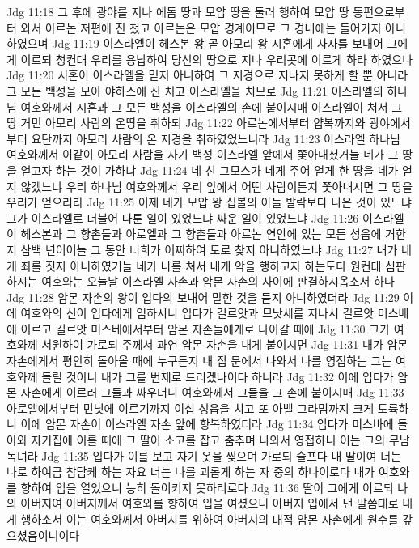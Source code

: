Jdg 11:18  그 후에 광야를 지나 에돔 땅과 모압 땅을 둘러 행하여 모압 땅 동편으로부터 와서 아르논 저편에 진 쳤고 아르논은 모압 경계이므로 그 경내에는 들어가지 아니 하였으며
Jdg 11:19  이스라엘이 헤스본 왕 곧 아모리 왕 시혼에게 사자를 보내어 그에게 이르되 청컨대 우리를 용납하여 당신의 땅으로 지나 우리곳에 이르게 하라 하였으나
Jdg 11:20  시혼이 이스라엘을 믿지 아니하여 그 지경으로 지나지 못하게 할 뿐 아니라 그 모든 백성을 모아 야하스에 진 치고 이스라엘을 치므로
Jdg 11:21  이스라엘의 하나님 여호와께서 시혼과 그 모든 백성을 이스라엘의 손에 붙이시매 이스라엘이 쳐서 그 땅 거민 아모리 사람의 온땅을 취하되
Jdg 11:22  아르논에서부터 얍복까지와 광야에서부터 요단까지 아모리 사람의 온 지경을 취하였었느니라
Jdg 11:23  이스라엘 하나님 여호와께서 이같이 아모리 사람을 자기 백성 이스라엘 앞에서 쫓아내셨거늘 네가 그 땅을 얻고자 하는 것이 가하냐
Jdg 11:24  네 신 그모스가 네게 주어 얻게 한 땅을 네가 얻지 않겠느냐 우리 하나님 여호와께서 우리 앞에서 어떤 사람이든지 쫓아내시면 그 땅을 우리가 얻으리라
Jdg 11:25  이제 네가 모압 왕 십볼의 아들 발락보다 나은 것이 있느냐 그가 이스라엘로 더불어 다툰 일이 있었느냐 싸운 일이 있었느냐
Jdg 11:26  이스라엘이 헤스본과 그 향촌들과 아로엘과 그 향촌들과 아르논 연안에 있는 모든 성읍에 거한지 삼백 년이어늘 그 동안 너희가 어찌하여 도로 찾지 아니하였느냐
Jdg 11:27  내가 네게 죄를 짓지 아니하였거늘 네가 나를 쳐서 내게 악을 행하고자 하는도다 원컨대 심판하시는 여호와는 오늘날 이스라엘 자손과 암몬 자손의 사이에 판결하시옵소서 하나
Jdg 11:28  암몬 자손의 왕이 입다의 보내어 말한 것을 듣지 아니하였더라
Jdg 11:29  이에 여호와의 신이 입다에게 임하시니 입다가 길르앗과 므낫세를 지나서 길르앗 미스베에 이르고 길르앗 미스베에서부터 암몬 자손들에게로 나아갈 때에
Jdg 11:30  그가 여호와께 서원하여 가로되 주께서 과연 암몬 자손을 내게 붙이시면
Jdg 11:31  내가 암몬 자손에게서 평안히 돌아올 때에 누구든지 내 집 문에서 나와서 나를 영접하는 그는 여호와께 돌릴 것이니 내가 그를 번제로 드리겠나이다 하니라
Jdg 11:32  이에 입다가 암몬 자손에게 이르러 그들과 싸우더니 여호와께서 그들을 그 손에 붙이시매
Jdg 11:33  아로엘에서부터 민닛에 이르기까지 이십 성읍을 치고 또 아벨 그라밈까지 크게 도륙하니 이에 암몬 자손이 이스라엘 자손 앞에 항복하였더라
Jdg 11:34  입다가 미스바에 돌아와 자기집에 이를 때에 그 딸이 소고를 잡고 춤추며 나와서 영접하니 이는 그의 무남독녀라
Jdg 11:35  입다가 이를 보고 자기 옷을 찢으며 가로되 슬프다 내 딸이여 너는 나로 하여금 참담케 하는 자요 너는 나를 괴롭게 하는 자 중의 하나이로다 내가 여호와를 향하여 입을 열었으니 능히 돌이키지 못하리로다
Jdg 11:36  딸이 그에게 이르되 나의 아버지여 아버지께서 여호와를 향하여 입을 여셨으니 아버지 입에서 낸 말씀대로 내게 행하소서 이는 여호와께서 아버지를 위하여 아버지의 대적 암몬 자손에게 원수를 갚으셨음이니이다
